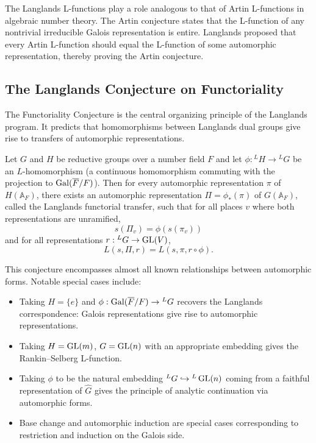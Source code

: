 The Langlands L-functions play a role analogous to that of Artin L-functions in algebraic number theory. The Artin conjecture states that the L-function of any nontrivial irreducible Galois representation is entire. Langlands proposed that every Artin L-function should equal the L-function of some automorphic representation, thereby proving the Artin conjecture.

\subsection{The Langlands Conjecture on Functoriality}

The Functoriality Conjecture is the central organizing principle of the Langlands program. It predicts that homomorphisms between Langlands dual groups give rise to transfers of automorphic representations.

\begin{conjecture}
Let \(G\) and \(H\) be reductive groups over a number field \(F\) and let \(\phi : {}^L H \to {}^L G\) be an \(L\)-homomorphism (a continuous homomorphism commuting with the projection to \(\operatorname{Gal}(\overline{F}/F)\)). Then for every automorphic representation \(\pi\) of \(H(\mathbb{A}_F)\), there exists an automorphic representation \(\Pi = \phi_*(\pi)\) of \(G(\mathbb{A}_F)\), called the Langlands functorial transfer, such that for all places \(v\) where both representations are unramified,
\[
s(\Pi_v) = \phi(s(\pi_v))
\]
and for all representations \(r : {}^L G \to \operatorname{GL}(V)\),
\[
L(s,\Pi,r) = L(s,\pi,r \circ \phi).
\]
\end{conjecture}

This conjecture encompasses almost all known relationships between automorphic forms. Notable special cases include:
\begin{itemize}
\item Taking \(H = \{e\}\) and \(\phi : \operatorname{Gal}(\overline{F}/F) \to {}^L G\) recovers the Langlands correspondence: Galois representations give rise to automorphic representations.
\item Taking \(H = \operatorname{GL}(m)\), \(G = \operatorname{GL}(n)\) with an appropriate embedding gives the Rankin--Selberg L-function.
\item Taking \(\phi\) to be the natural embedding \({}^L G \hookrightarrow {}^L \operatorname{GL}(n)\) coming from a faithful representation of \(\widehat{G}\) gives the principle of analytic continuation via automorphic forms.
\item Base change and automorphic induction are special cases corresponding to restriction and induction on the Galois side.
\end{itemize}

